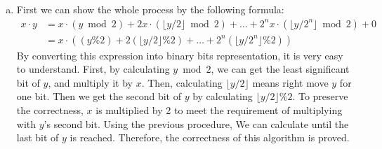 \documentclass[12pt, a4paper]{article}
\begin{document}
\begin{enumerate}
\begin{enumerate}[a)]
\begin{algorithm}[]
              \end{algorithm}
              \newpage
        \item First we can show the whole process by the following formula: 
              \begin{align*}
                  x\cdot y &= x\cdot (y\bmod 2) + 2x\cdot (\lfloor y/2 \rfloor \bmod 2) + \dots + 2^nx\cdot (\lfloor y/2^n \rfloor \bmod 2) + 0\\
                           &= x\cdot ((y \% 2) + 2(\lfloor y/2 \rfloor \% 2) + \dots + 2^n(\lfloor y/2^n \rfloor \% 2))
              \end{align*}
              By converting this expression into binary bits representation, it is very easy to understand. 
              First, by calculating $y\bmod 2$, we can get the least significant bit of $y$, and multiply it by $x$. 
              Then, calculating $\lfloor y/2 \rfloor$ means right move $y$ for one bit. 
              Then we get the second bit of $y$ by calculating $\lfloor y/2 \rfloor \% 2$. 
              To preserve the correctness, $x$ is multiplied by 2 to meet the requirement of multiplying with $y$'s second bit. 
              Using the previous procedure, We can calculate until the last bit of $y$ is reached. 
              Therefore, the correctness of this algorithm is proved.
    \end{enumerate}
\end{enumerate}
\end{document}
